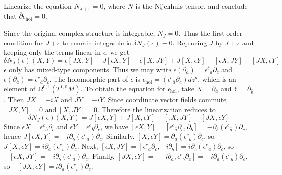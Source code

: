 \documentclass[12pt]{article}
\begin{document}
\begin{exercise}
    Linearize the equation $N_{J+\epsilon}=0$, where $N$ is the Nijenhuis tensor, and conclude that $\overline\partial\epsilon_{\mathrm{hol}}=0$.
\end{exercise}
\begin{solution}
    Since the original complex structure is integrable, $N_J=0$. Thus the first-order condition for $J+\epsilon$ to remain integrable is $\delta N_J(\epsilon)=0$.
    Replacing $J$ by $J+\epsilon$ and keeping only the terms linear in $\epsilon$, we get
    \[\delta N_J(\epsilon)(X,Y)=\epsilon[JX,Y]+J[\epsilon X,Y]+\epsilon[X,JY]+J[X,\epsilon Y]-[\epsilon X,JY]-[JX,\epsilon Y]\]
    $\epsilon$ only has mixed-type components. Thus we may write $\epsilon(\partial_a)=\epsilon^{\overline c}{}_a\partial_{\overline c}$ and $\epsilon(\partial_{\overline a})=\epsilon^c{}_{\overline a}\partial_c$. The holomorphic part of $\epsilon$ is $\epsilon_{\mathrm{hol}}=(\epsilon^c{}_{\overline a}\partial_c)d\overline z^a$, which is an element of $\Omega^{0,1}(T^{1,0}M)$.
    To obtain the equation for $\epsilon_{\mathrm{hol}}$, take $X=\partial_{\overline a}$ and $Y=\partial_{\overline b}$. Then $JX=-iX$ and $JY=-iY$. Since coordinate vector fields commute, $[JX,Y]=0$ and $[X,JY]=0$. Therefore the linearization reduces to \[\delta N_J(\epsilon)(X,Y)=J[\epsilon X,Y]+J[X,\epsilon Y]-[\epsilon X,JY]-[JX,\epsilon Y]\]
    Since $\epsilon X=\epsilon^c{}_{\overline a}\partial_c$ and $\epsilon Y=\epsilon^c{}_{\overline b}\partial_c$, we have $[\epsilon X,Y]=[\epsilon^c{}_{\overline a}\partial_c,\partial_{\overline b}]=-\partial_{\overline b}(\epsilon^c{}_{\overline a})\partial_c$, hence $J[\epsilon X,Y]=-i\partial_{\overline b}(\epsilon^c{}_{\overline a})\partial_c$. Similarly, $[X,\epsilon Y]=\partial_{\overline a}(\epsilon^c{}_{\overline b})\partial_c$, so $J[X,\epsilon Y]=i\partial_{\overline a}(\epsilon^c{}_{\overline b})\partial_c$.
    Next, $[\epsilon X,JY]=[\epsilon^c{}_{\overline a}\partial_c,-i\partial_{\overline b}]=i\partial_{\overline b}(\epsilon^c{}_{\overline a})\partial_c$, so $-[\epsilon X,JY]=-i\partial_{\overline b}(\epsilon^c{}_{\overline a})\partial_c$. Finally, $[JX,\epsilon Y]=[-i\partial_{\overline a},\epsilon^c{}_{\overline b}\partial_c]=-i\partial_{\overline a}(\epsilon^c{}_{\overline b})\partial_c$, so $-[JX,\epsilon Y]=i\partial_{\overline a}(\epsilon^c{}_{\overline b})\partial_c$.



\end{solution}
\end{document}
